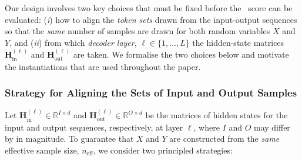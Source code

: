 Our design involves two key choices that must be fixed before the
\method~score can be evaluated:  
(\textit{i}) how to align the \emph{token sets} drawn from the input-output
sequences so that the \emph{same} number of samples are drawn for both random variables $X$ and $Y$, and
(\textit{ii}) from which  \emph{decoder layer}, $\ell\!\in\!\{1,\dots,L\}$ the
hidden-state matrices $\mathbf H^{(\ell)}_{\text{in}}$ and
$\mathbf H^{(\ell)}_{\text{out}}$ are taken.  We formalise the two
choices below and motivate the instantiations that are used throughout the
paper.

\subsubsection{Strategy for Aligning the Sets of Input and Output Samples}
\label{sec:token_alignment}
Let $\mathbf H^{(\ell)}_{\text{in}}\!\in\!\mathbb R^{I\times d}$ and
$\mathbf H^{(\ell)}_{\text{out}}\!\in\!\mathbb R^{O\times d}$ be the matrices
of hidden states for the input and output sequences, respectively, at layer $\ell$, where $I$ and $O$ may differ by in magnitude.  
To guarantee that $X$ and $Y$ are constructed from the \emph{same} effective
sample size, $n_{\text{eff}}$, we consider two principled strategies:

